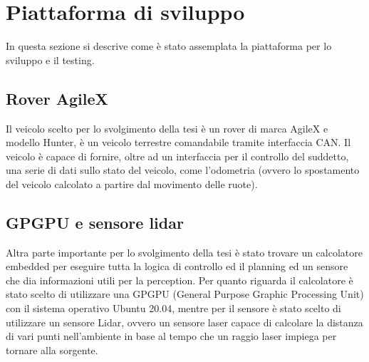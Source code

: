 \section{Piattaforma di sviluppo}
In questa sezione si descrive come è stato assemplata la piattaforma per lo sviluppo e il testing.
\subsection{Rover AgileX}
Il veicolo scelto per lo svolgimento della tesi è un rover di marca AgileX e modello Hunter, è un veicolo terrestre comandabile tramite interfaccia CAN. Il veicolo è capace di fornire, oltre ad un interfaccia per il controllo del suddetto, una serie di dati sullo stato del veicolo, come l'odometria (ovvero lo spostamento del veicolo calcolato a partire dal movimento delle ruote).
\subsection{GPGPU e sensore lidar}
Altra parte importante per lo svolgimento della tesi è stato trovare un calcolatore embedded per eseguire tutta la logica di controllo ed il planning ed un sensore che dia informazioni utili per la perception.
Per quanto riguarda il calcolatore è stato scelto di utilizzare una GPGPU (General Purpose Graphic Processing Unit) con il sistema operativo Ubuntu 20.04, mentre per il sensore è stato scelto di utilizzare un sensore Lidar, ovvero un sensore laser capace di calcolare la distanza di vari punti nell'ambiente in base al tempo che un raggio laser impiega per tornare alla sorgente.


